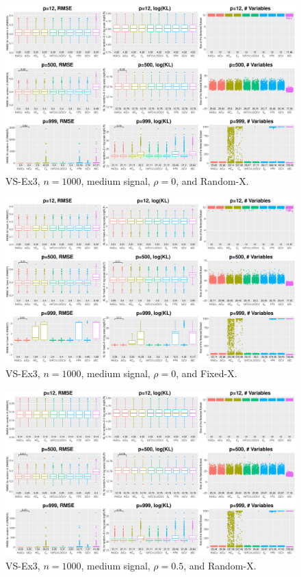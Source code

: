 \clearpage
\begin{figure}[!ht]
\centering
\includegraphics[width=\textwidth]{figures/supplement/randomx_VS-Ex3_n1000_msnr_rho0.eps}
\caption{VS-Ex3, $n=1000$, medium signal, $\rho=0$, and Random-X.}
\end{figure}
\begin{figure}[!ht]
\centering
\includegraphics[width=\textwidth]{figures/supplement/fixedx_VS-Ex3_n1000_msnr_rho0.eps}
\caption{VS-Ex3, $n=1000$, medium signal, $\rho=0$, and Fixed-X.}
\end{figure}
\clearpage
\begin{figure}[!ht]
\centering
\includegraphics[width=\textwidth]{figures/supplement/randomx_VS-Ex3_n1000_msnr_rho05.eps}
\caption{VS-Ex3, $n=1000$, medium signal, $\rho=0.5$, and Random-X.}
\end{figure}
